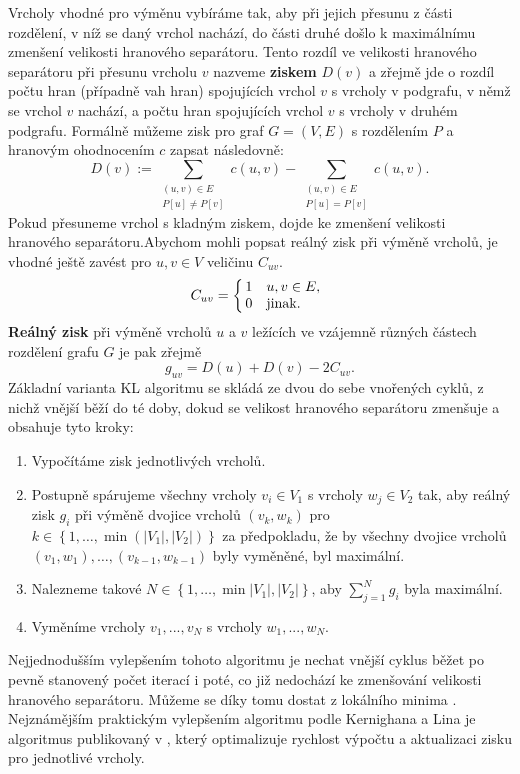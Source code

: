 \documentclass[11pt,american,czech,oneside]{book}
\theoremstyle{plain}
\theoremstyle{definition}
\begin{document}
Vrcholy vhodné pro výměnu vybíráme tak, aby při jejich přesunu z části rozdělení, v níž se daný vrchol nachází, do části druhé došlo k maximálnímu zmenšení velikosti hranového separátoru. Tento rozdíl ve velikosti hranového separátoru při přesunu vrcholu $v$ nazveme \textbf{ziskem} $D(v)$ a zřejmě jde o rozdíl počtu hran (případně vah hran) spojujících vrchol $v$ s vrcholy v podgrafu, v němž se vrchol $v$ nachází, a počtu hran spojujících vrchol $v$ s vrcholy v druhém podgrafu. Formálně můžeme zisk pro graf $G=(V,E)$ s rozdělením $P$ a hranovým ohodnocením $c$ zapsat následovně:
\[
D(v) := \sum\limits_{\substack{(u,v) \in E \\ P[u] \neq P[v]}}c(u,v) - \sum\limits_{\substack{(u,v) \in E \\ P[u] = P[v]}}c(u,v).
\]
Pokud přesuneme vrchol s kladným ziskem, dojde ke zmenšení velikosti hranového separátoru.Abychom mohli popsat reálný zisk při výměně vrcholů, je vhodné ještě zavést pro $u,v \in V$ veličinu $C_{uv}$.
\[
C_{uv}=
    \left\{
    \begin{array}{@{\,}ll}
		1  & \mbox{} {u,v} \in E,\\
		0 & \mbox{jinak.}
	\end{array}
\right.
\]
\textbf{Reálný zisk} při výměně vrcholů $u$ a $v$ ležících ve vzájemně různých částech rozdělení grafu $G$ je pak zřejmě
\[
g_{uv}=D(u)+D(v)-2C_{uv}.
\]
Základní varianta KL algoritmu se skládá ze dvou do sebe vnořených cyklů, z nichž vnější běží do té doby, dokud se velikost hranového separátoru zmenšuje a obsahuje tyto kroky:
\begin{enumerate}
  \item Vypočítáme zisk jednotlivých vrcholů.
  \item Postupně spárujeme všechny vrcholy $v_i \in V_1$ s vrcholy $w_j \in V_2$ tak, aby reálný zisk $g_i$ při výměně dvojice vrcholů $(v_k,w_k)$ pro $k \in \left\{1,\ldots,\min(|V_1|,|V_2|)\right\}$ za předpokladu, že by všechny dvojice vrcholů $(v_1,w_1),\ldots,(v_{k-1},w_{k-1})$ byly vyměněné, byl maximální.
  \item Nalezneme takové $N \in \left\{1,\ldots,\min{|V_1|,|V_2|}\right\}$, aby $\sum_{j=1}^{N}g_i$ byla maximální.
  \item Vyměníme vrcholy $v_1,...,v_N$ s vrcholy $w_1,...,w_N$.
\end{enumerate}

Nejjednodušším vylepšením tohoto algoritmu je nechat vnější cyklus běžet po pevně stanovený počet iterací i poté, co již nedochází ke zmenšování velikosti hranového separátoru. Můžeme se díky tomu dostat z lokálního minima \cite{keli:70}. Nejznámějším praktickým vylepšením algoritmu podle Kernighana a Lina je algoritmus publikovaný v \cite{fima:89}, který optimalizuje rychlost výpočtu a aktualizaci zisku pro jednotlivé vrcholy.
\end{document}
